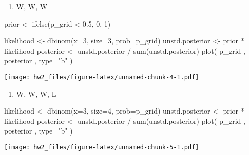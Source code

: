 \documentclass[
]{article}
\newenvironment{Shaded}{\begin{snugshade}}{\end{snugshade}}
\newcommand{\AttributeTok}[1]{\textcolor[rgb]{0.77,0.63,0.00}{#1}}
\newcommand{\DecValTok}[1]{\textcolor[rgb]{0.00,0.00,0.81}{#1}}
\newcommand{\FloatTok}[1]{\textcolor[rgb]{0.00,0.00,0.81}{#1}}
\newcommand{\FunctionTok}[1]{\textcolor[rgb]{0.00,0.00,0.00}{#1}}
\newcommand{\NormalTok}[1]{#1}
\newcommand{\OtherTok}[1]{\textcolor[rgb]{0.56,0.35,0.01}{#1}}
\newcommand{\SpecialCharTok}[1]{\textcolor[rgb]{0.00,0.00,0.00}{#1}}
\newcommand{\StringTok}[1]{\textcolor[rgb]{0.31,0.60,0.02}{#1}}
\providecommand{\tightlist}{%
  \setlength{\itemsep}{0pt}\setlength{\parskip}{0pt}}
\begin{document}
\begin{enumerate}
\def\labelenumi{(\arabic{enumi})}
\tightlist
\item
  W, W, W
\end{enumerate}

\begin{Shaded}
\begin{Highlighting}[]
\NormalTok{prior }\OtherTok{\textless{}{-}} \FunctionTok{ifelse}\NormalTok{(p\_grid }\SpecialCharTok{\textless{}} \FloatTok{0.5}\NormalTok{, }\DecValTok{0}\NormalTok{, }\DecValTok{1}\NormalTok{)}

\NormalTok{likelihood }\OtherTok{\textless{}{-}} \FunctionTok{dbinom}\NormalTok{(}\AttributeTok{x=}\DecValTok{3}\NormalTok{, }\AttributeTok{size=}\DecValTok{3}\NormalTok{, }\AttributeTok{prob=}\NormalTok{p\_grid)}
\NormalTok{unstd.posterior }\OtherTok{\textless{}{-}}\NormalTok{ prior }\SpecialCharTok{*}\NormalTok{ likelihood}
\NormalTok{posterior }\OtherTok{\textless{}{-}}\NormalTok{ unstd.posterior }\SpecialCharTok{/} \FunctionTok{sum}\NormalTok{(unstd.posterior)}
\FunctionTok{plot}\NormalTok{( p\_grid , posterior , }\AttributeTok{type=}\StringTok{"b"}\NormalTok{ )}
\end{Highlighting}
\end{Shaded}

\texttt{[image: hw2\_files/figure-latex/unnamed-chunk-4-1.pdf]}

\begin{enumerate}
\def\labelenumi{(\arabic{enumi})}
\setcounter{enumi}{1}
\tightlist
\item
  W, W, W, L
\end{enumerate}

\begin{Shaded}
\begin{Highlighting}[]
\NormalTok{likelihood }\OtherTok{\textless{}{-}} \FunctionTok{dbinom}\NormalTok{(}\AttributeTok{x=}\DecValTok{3}\NormalTok{, }\AttributeTok{size=}\DecValTok{4}\NormalTok{, }\AttributeTok{prob=}\NormalTok{p\_grid)}
\NormalTok{unstd.posterior }\OtherTok{\textless{}{-}}\NormalTok{ prior }\SpecialCharTok{*}\NormalTok{ likelihood}
\NormalTok{posterior }\OtherTok{\textless{}{-}}\NormalTok{ unstd.posterior }\SpecialCharTok{/} \FunctionTok{sum}\NormalTok{(unstd.posterior)}
\FunctionTok{plot}\NormalTok{( p\_grid , posterior , }\AttributeTok{type=}\StringTok{"b"}\NormalTok{ )}
\end{Highlighting}
\end{Shaded}

\texttt{[image: hw2\_files/figure-latex/unnamed-chunk-5-1.pdf]}
\end{document}
